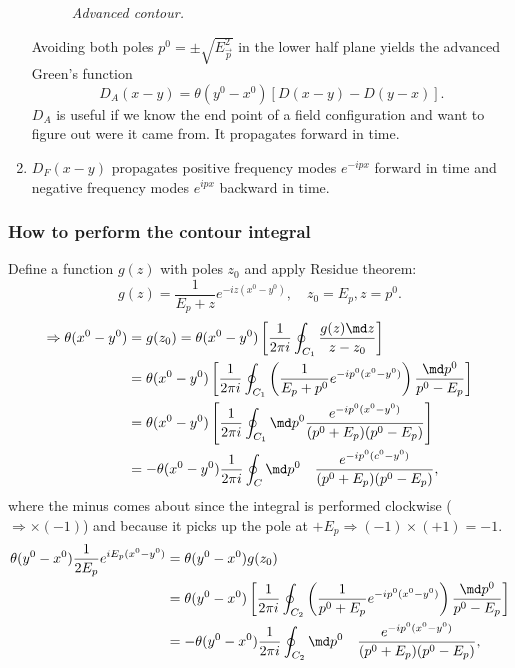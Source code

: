 \begin{enumerate}
\begin{figure}[h]
	\caption{\itshape Advanced contour.}
	\label{fig:advancedcontour}
\end{figure}
Avoiding both poles $p^0 = \pm \sqrt{E^2_{\vec{p}}}$ in the lower half plane yields the advanced Green's function
\begin{equation}
	D_A (x-y) = \theta(y^0-x^0) [D(x-y)-D(y-x)].
\end{equation}
$D_A$ is useful if we know the end point of a field configuration and want to figure out were it came from. It propagates forward in time.
\item $D_F(x-y)$ propagates positive frequency modes $e^{- i px}$ forward in time and negative frequency modes $e^{ipx}$ backward in time.
\end{enumerate}
\subsubsection{How to perform the contour integral}
Define a function $g(z)$ with poles $z_0$ and apply Residue theorem:
\begin{equation*}
	g(z) =\frac{1}{E_p+z} e^{-i z (x^0-y^0)}, \quad z_0 =E_p, z=p^0.
\end{equation*}
\begin{align*}
	\Rightarrow \theta(x^0-y^0)&=g(z_0)=\theta(x^0-y^0) \left[\frac{1}{2 \pi i} \oint_{C_1} \frac{g(z) \md z}{z-z_0}\right]\\
	&=\theta(x^0-y^0) \left[\frac{1}{2 \pi i}\oint_{C_1} \left(\frac{1}{E_p+p^0} e^{-i p^0 (x^0-y^0)} \right) \frac{\md p^0}{p^0-E_p}\right] \\
	&= \theta(x^0-y^0) \left[\frac{1}{2 \pi i} \oint_{C_1} \md p^0 \frac{e^{-i p^0(x^0-y^0)}}{(p^0+E_p)(p^0-E_p)}\right] \\
	&=-\theta(x^0-y^0) \frac{1}{2 \pi i} \oint_C \md p^0 \quad \frac{e^{-ip^0(c^0-y^0)}}{(p^0 + E_p)(p^0-E_p)},
\end{align*}
where the minus comes about since the integral is performed clockwise ($\Rightarrow \times (-1)$) and because it picks up the pole at $+E_p \Rightarrow (-1) \times (+1)=-1$.\\
\begin{align*}
	\theta(y^0-x^0) \frac{1}{2 E_p} e^{i E_p (x^0-y^0)} &= \theta(y^0-x^0) g(z_0) \\
	&=\theta(y^0-x^0) \left[\frac{1}{2 \pi i} \oint_{C_2} \left(\frac{1}{p^0+E_p} e^{-i p^0 (x^0-y^0)} \right) \frac{\md p^0}{p^0-E_p}\right] \\
	&= - \theta(y^0-x^0) \frac{1}{2 \pi i} \oint_{C_2} \md p^0 \quad \frac{e^{-i p^0(x^0-y^0)}}{(p^0+E_p)(p^0-E_p)},
\end{align*}

